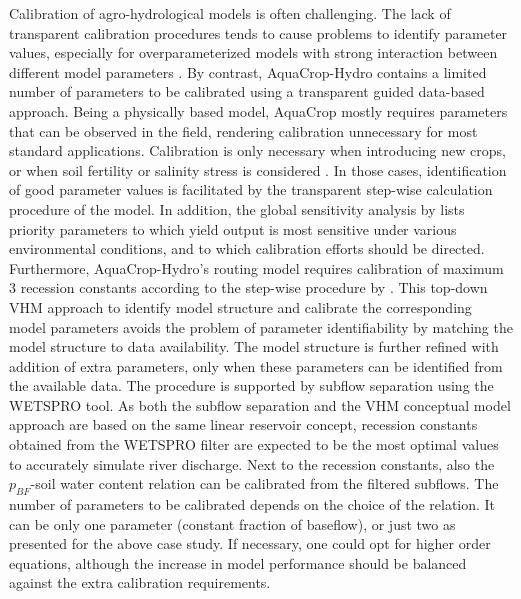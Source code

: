 Calibration of agro-hydrological models is often challenging. The lack of transparent calibration procedures tends to cause problems to identify parameter values, especially for overparameterized models with strong interaction between different model parameters \parencite{andreassian2012, beven2006}. By contrast, AquaCrop-Hydro contains a limited number of parameters to be calibrated using a transparent guided data-based approach. Being a physically based model, AquaCrop mostly requires parameters that can be observed in the field, rendering calibration unnecessary for most standard applications. Calibration is only necessary when introducing new crops, or when soil fertility or salinity stress is considered \parencite{vanuytrecht2014a}. In those cases, identification of good parameter values is facilitated by the transparent step-wise calculation procedure of the model. In addition, the global sensitivity analysis by \textcite{vanuytrecht2014b} lists priority parameters to which yield output is most sensitive under various environmental conditions, and to which calibration efforts should be directed. Furthermore, AquaCrop-Hydro’s routing model requires calibration of maximum 3 recession constants according to the step-wise procedure by \textcite{willems2014a}. This top-down VHM approach to identify model structure and calibrate the corresponding model parameters avoids the problem of parameter identifiability by matching the model structure to data availability. The model structure is further refined with addition of extra parameters, only when these parameters can be identified from the available data. The procedure is supported by subflow separation using the WETSPRO tool. As both the subflow separation and the VHM conceptual model approach are based on the same linear reservoir concept, recession constants obtained from the WETSPRO filter are expected to be the most optimal values to accurately simulate river discharge. Next to the recession constants, also the $p_{BF}$-soil water content relation can  be calibrated from the filtered subflows. The number of parameters to be calibrated depends on the choice of the relation. It can be only one parameter (constant fraction of baseflow), or just two as presented for the above case study. If necessary, one could opt for higher order equations, although the increase in model performance should be balanced against the extra calibration requirements.

